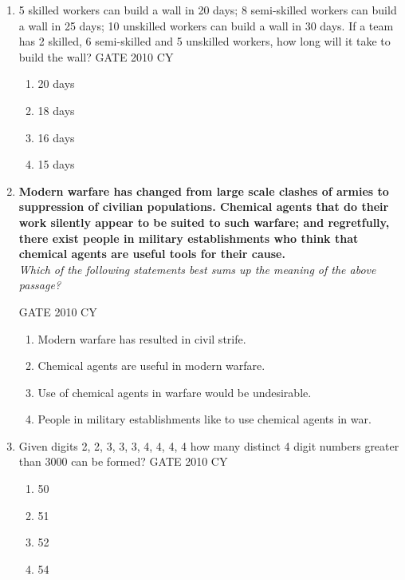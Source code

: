 \documentclass[journal,12pt,onecolumn]{IEEEtran}
\theoremstyle{remark}
\begin{document}
\begin{enumerate}
\item 5 skilled workers can build a wall in 20 days; 8 semi-skilled workers can build a wall in 25 days; 10 unskilled workers can build a wall in 30 days. If a team has 2 skilled, 6 semi-skilled and 5 unskilled workers, how long will it take to build the wall?
\hfill{GATE 2010 CY}

\begin{multicols}{2}
\begin{enumerate}
    \item 20 days
    \item 18 days
    \item 16 days
    \item 15 days
\end{enumerate}
\end{multicols}

\item \textbf{Modern warfare has changed from large scale clashes of armies to suppression of civilian populations. Chemical agents that do their work silently appear to be suited to such warfare; and regretfully, there exist people in military establishments who think that chemical agents are useful tools for their cause.}\\
\textit{Which of the following statements best sums up the meaning of the above passage?}

\hfill{GATE 2010 CY}

\begin{multicols}{2}
\begin{enumerate}
    \item Modern warfare has resulted in civil strife.
    \item Chemical agents are useful in modern warfare.
    \item Use of chemical agents in warfare would be undesirable.
    \item People in military establishments like to use chemical agents in war.
\end{enumerate}
\end{multicols}

\item Given digits 2, 2, 3, 3, 3, 4, 4, 4, 4 how many distinct 4 digit numbers greater than 3000 can be formed?
\hfill{GATE 2010 CY}

\begin{multicols}{2}
\begin{enumerate}
    \item 50
    \item 51
    \item 52
    \item 54
\end{enumerate}
\end{multicols}


\end{enumerate}
\end{document}
